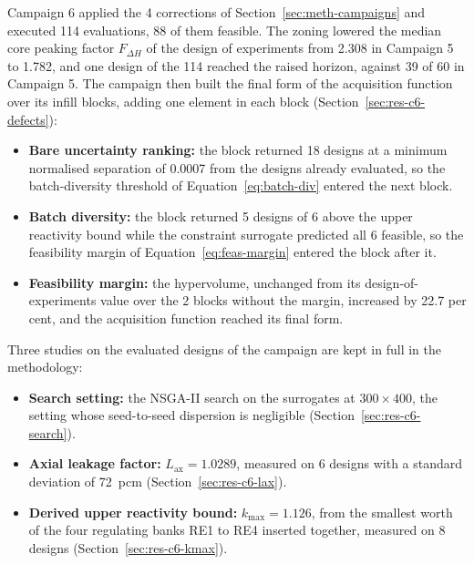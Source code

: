 Campaign 6 applied the 4 corrections of
Section~\ref{sec:meth-campaigns} and executed 114 evaluations, 88 of them
feasible. The zoning lowered the median core peaking factor $F_{\Delta H}$ of the
design of experiments from 2.308 in Campaign 5 to 1.782, and one
design of the 114 reached the raised horizon, against 39 of 60 in
Campaign 5. The campaign then built the final form of the acquisition function
over its infill blocks, adding one element in each block
(Section~\ref{sec:res-c6-defects}):

\begin{itemize}
  \item \textbf{Bare uncertainty ranking:} the block returned 18 designs
        at a minimum normalised separation of 0.0007 from the designs
        already evaluated, so the batch-diversity threshold of
        Equation~\eqref{eq:batch-div} entered the next block.

  \item \textbf{Batch diversity:} the block returned 5 designs of 6
        above the upper reactivity bound while the constraint surrogate
        predicted all 6 feasible, so the feasibility margin of
        Equation~\eqref{eq:feas-margin} entered the block after it.

  \item \textbf{Feasibility margin:} the hypervolume, unchanged from its
        design-of-experiments value over the 2 blocks without the
        margin, increased by 22.7 per cent, and the acquisition function
        reached its final form.
\end{itemize}

Three studies on the evaluated designs of the campaign are kept in full in the
methodology:

\begin{itemize}
  \item \textbf{Search setting:} the NSGA-II search on the surrogates
        at $300\times400$, the setting whose seed-to-seed dispersion is
        negligible (Section~\ref{sec:res-c6-search}).

  \item \textbf{Axial leakage factor:} $L_\mathrm{ax} = 1.0289$, measured on 6 designs
        with a standard deviation of \SI{72}{pcm}
        (Section~\ref{sec:res-c6-lax}).

  \item \textbf{Derived upper reactivity bound:} $k_{\max} = 1.126$, from the smallest worth of the four regulating
        banks RE1 to RE4 inserted together, measured on 8 designs
        (Section~\ref{sec:res-c6-kmax}).
\end{itemize}

